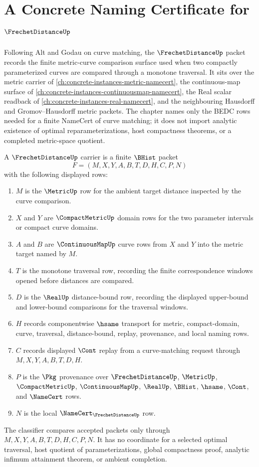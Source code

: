 \chapter{A Concrete Naming Certificate for $\FrechetDistanceUp$}
\label{ch:concrete-instances-frechet-distance-namecert}

Following Alt and Godau on curve matching, the $\FrechetDistanceUp$ packet records the finite metric-curve comparison surface used when two compactly parameterized curves are compared through a monotone traversal. It sits over the metric carrier of \autoref{ch:concrete-instances-metric-namecert}, the continuous-map surface of \autoref{ch:concrete-instances-continuousmap-namecert}, the Real scalar readback of \autoref{ch:concrete-instances-real-namecert}, and the neighbouring Hausdorff and Gromov--Hausdorff metric packets. The chapter names only the BEDC rows needed for a finite NameCert of curve matching; it does not import analytic existence of optimal reparameterizations, host compactness theorems, or a completed metric-space quotient.

\begin{definition}
\label{def:frechet-distance-carrier}
A $\FrechetDistanceUp$ carrier is a finite $\BHist$ packet
$$
F=(M,X,Y,A,B,T,D,H,C,P,N)
$$
with the following displayed rows:
\begin{enumerate}
\item $M$ is the $\MetricUp$ row for the ambient target distance inspected by the curve comparison.
\item $X$ and $Y$ are $\CompactMetricUp$ domain rows for the two parameter intervals or compact curve domains.
\item $A$ and $B$ are $\ContinuousMapUp$ curve rows from $X$ and $Y$ into the metric target named by $M$.
\item $T$ is the monotone traversal row, recording the finite correspondence windows opened before distances are compared.
\item $D$ is the $\RealUp$ distance-bound row, recording the displayed upper-bound and lower-bound comparisons for the traversal windows.
\item $H$ records componentwise $\hsame$ transport for metric, compact-domain, curve, traversal, distance-bound, replay, provenance, and local naming rows.
\item $C$ records displayed $\Cont$ replay from a curve-matching request through $M,X,Y,A,B,T,D,H$.
\item $P$ is the $\Pkg$ provenance over $\FrechetDistanceUp$, $\MetricUp$, $\CompactMetricUp$, $\ContinuousMapUp$, $\RealUp$, $\BHist$, $\hsame$, $\Cont$, and $\NameCert$ rows.
\item $N$ is the local $\NameCert_{\FrechetDistanceUp}$ row.
\end{enumerate}
The classifier compares accepted packets only through $M,X,Y,A,B,T,D,H,C,P,N$. It has no coordinate for a selected optimal traversal, host quotient of parameterizations, global compactness proof, analytic infimum attainment theorem, or ambient completion.
\end{definition}

